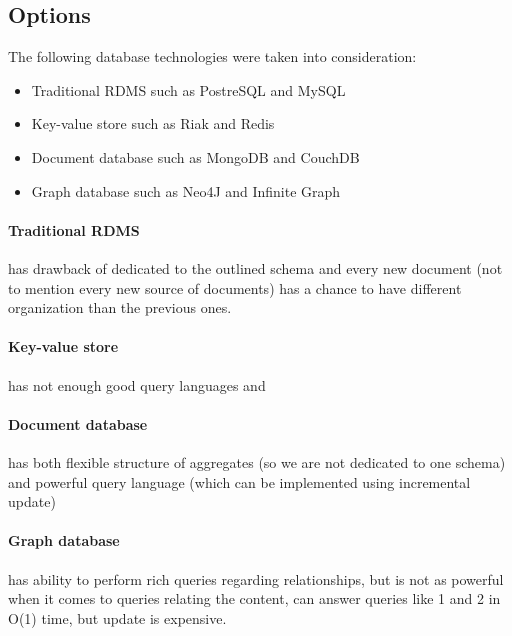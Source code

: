 \documentclass[11pt, a4paper]{report}
\begin{document}
\subsection{Options}
The following database technologies were taken into consideration:
\begin{itemize}
  \item Traditional RDMS such as PostreSQL and MySQL
  \item Key-value store such as Riak and Redis
  \item Document database such as MongoDB and CouchDB
  \item Graph database such as Neo4J and Infinite Graph
\end{itemize}

\paragraph{Traditional RDMS} has drawback of dedicated to the outlined schema and every new document (not to mention every new source of documents) has a chance to have different organization than the previous ones.

\paragraph{Key-value store} has not enough good query languages and 

\paragraph{Document database} has both flexible structure of aggregates (so we are not dedicated to one schema) and powerful query language (which can be implemented using incremental update)

\paragraph{Graph database} has ability to perform rich queries regarding relationships, but is not as powerful when it comes to queries relating the content, can answer queries like 1 and 2 in O(1) time, but update is expensive.
\end{document}
